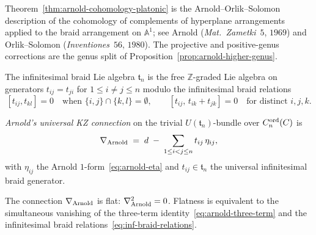 \begin{remark}[Attribution]
\label{rem:arnold-attribution-platonic}
Theorem~\ref{thm:arnold-cohomology-platonic} is the Arnold--Orlik--Solomon
description of the cohomology of complements of hyperplane arrangements
applied to the braid arrangement on $\mathbb{A}^1$; see Arnold
(\textit{Mat.\ Zametki}~$5$, $1969$) and Orlik--Solomon
(\textit{Inventiones}~$56$, $1980$). The projective and positive-genus
corrections are the genus split of
Proposition~\ref{prop:arnold-higher-genus}.
\end{remark}

\begin{definition}
\label{def:infinitesimal-braid-lie-algebra-platonic}
The infinitesimal braid Lie algebra $\mathfrak{t}_n$ is the free
$\mathbb{Z}$-graded Lie algebra on generators
$t_{ij} = t_{ji}$ for $1 \leq i \neq j \leq n$ modulo the
infinitesimal braid relations
\begin{equation}
\label{eq:inf-braid-relations}
 [t_{ij}, t_{kl}] = 0 \quad \text{when } \{i,j\} \cap \{k,l\} = \emptyset,
 \qquad
 [t_{ij},\, t_{ik} + t_{jk}] = 0 \quad \text{for distinct } i,j,k.
\end{equation}
\end{definition}

\begin{definition}
\label{def:arnold-universal-kz-connection-platonic}
\emph{Arnold's universal KZ connection} on the trivial
$U(\mathfrak{t}_n)$\nobreakdash-bundle over $C_n^{\mathrm{ord}}(C)$ is
\begin{equation}
\label{eq:nabla-arnold}
 \nabla_{\mathrm{Arnold}}
 \;=\; d \;-\; \sum_{1 \leq i < j \leq n} t_{ij}\,\eta_{ij},
\end{equation}
with $\eta_{ij}$ the Arnold $1$-form~\eqref{eq:arnold-eta} and
$t_{ij} \in \mathfrak{t}_n$ the universal infinitesimal braid generator.
\end{definition}

\begin{proposition}
\label{prop:arnold-flatness-platonic}
\ClaimStatusProvedElsewhere
The connection $\nabla_{\mathrm{Arnold}}$ is flat: $\nabla_{\mathrm{Arnold}}^{2} = 0$. Flatness
is equivalent to the simultaneous vanishing of the three-term
identity~\eqref{eq:arnold-three-term} and the infinitesimal braid
relations~\eqref{eq:inf-braid-relations}.
\end{proposition}


